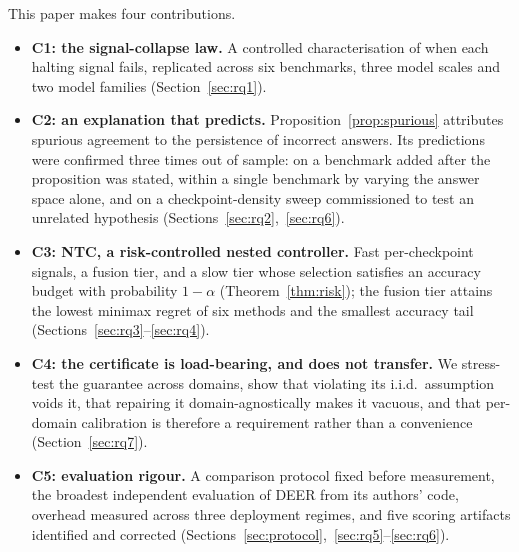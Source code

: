 \documentclass[acmsmall]{acmart}
\theoremstyle{acmdefinition}%
\theoremstyle{acmplain}}{}%
\begin{document}
This paper makes four contributions.
\begin{itemize}
\item \textbf{C1: the signal-collapse law.} A controlled characterisation of when each halting signal fails, replicated across six benchmarks, three model scales and two model families (Section~\ref{sec:rq1}).
\item \textbf{C2: an explanation that predicts.} Proposition~\ref{prop:spurious} attributes spurious agreement to the persistence of incorrect answers. Its predictions were confirmed three times out of sample: on a benchmark added after the proposition was stated, within a single benchmark by varying the answer space alone, and on a checkpoint-density sweep commissioned to test an unrelated hypothesis (Sections~\ref{sec:rq2},~\ref{sec:rq6}).
\item \textbf{C3: NTC, a risk-controlled nested controller.} Fast per-checkpoint signals, a fusion tier, and a slow tier whose selection satisfies an accuracy budget with probability $1-\alpha$ (Theorem~\ref{thm:risk}); the fusion tier attains the lowest minimax regret of six methods and the smallest accuracy tail (Sections~\ref{sec:rq3}--\ref{sec:rq4}).
\item \textbf{C4: the certificate is load-bearing, and does not transfer.} We stress-test the guarantee across domains, show that violating its i.i.d.\ assumption voids it, that repairing it domain-agnostically makes it vacuous, and that per-domain calibration is therefore a requirement rather than a convenience (Section~\ref{sec:rq7}).
\item \textbf{C5: evaluation rigour.} A comparison protocol fixed before measurement, the broadest independent evaluation of DEER from its authors' code, overhead measured across three deployment regimes, and five scoring artifacts identified and corrected (Sections~\ref{sec:protocol},~\ref{sec:rq5}--\ref{sec:rq6}).
\end{itemize}
\end{document}
